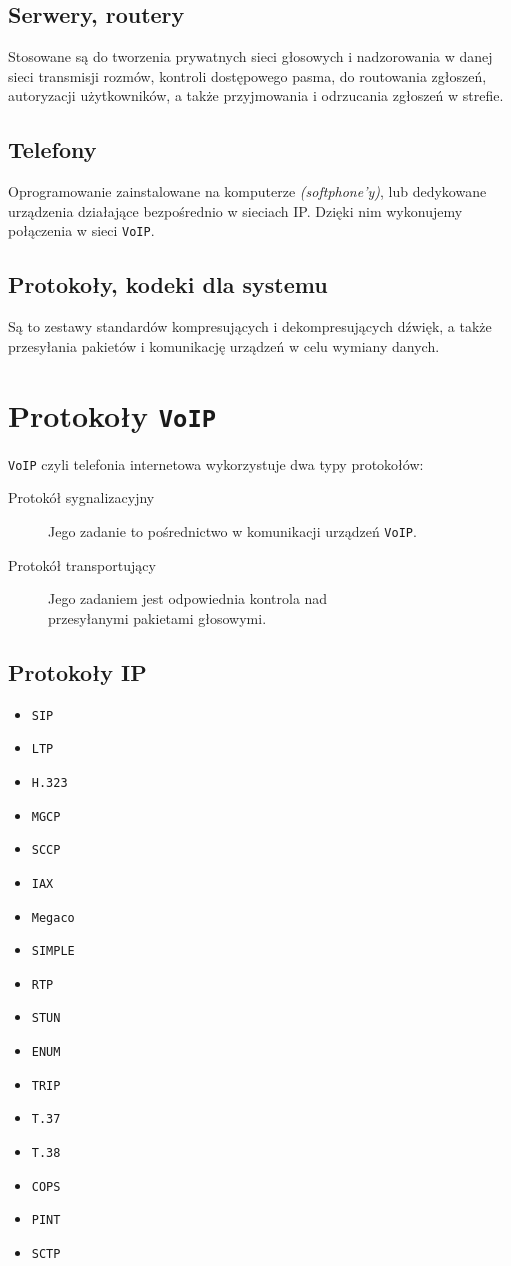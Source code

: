 \documentclass{article}
\begin{document}
\subsection{Serwery, routery}
Stosowane są do tworzenia prywatnych sieci głosowych i nadzorowania w danej sieci transmisji
rozmów, kontroli dostępowego pasma, do routowania zgłoszeń, autoryzacji
użytkowników, a także przyjmowania i odrzucania zgłoszeń w strefie.
\subsection{Telefony}
Oprogramowanie zainstalowane na komputerze \emph{(softphone'y)},
lub dedykowane urządzenia działające bezpośrednio w sieciach IP.
Dzięki nim wykonujemy połączenia w sieci {\tt VoIP}.
\subsection{Protokoły, kodeki dla systemu}
Są to zestawy standardów kompresujących i dekompresujących dźwięk,
a także przesyłania pakietów i komunikację urządzeń w celu wymiany danych.
\section{Protokoły {\tt VoIP}}
{\tt VoIP} czyli telefonia internetowa wykorzystuje dwa typy protokołów:
\begin{description}
    \item[Protokół sygnalizacyjny] Jego zadanie to pośrednictwo w komunikacji urządzeń {\tt VoIP}.
    \item[Protokół transportujący] Jego zadaniem jest odpowiednia kontrola nad \\
    przesyłanymi pakietami głosowymi.
\end{description}
\pagebreak
\subsection{Protokoły IP}
\begin{itemize}
    \item {\tt SIP}
    \item {\tt LTP}
    \item {\tt H.323}
    \item {\tt MGCP}
    \item {\tt SCCP}
    \item {\tt IAX}
    \item {\tt Megaco}
    \item {\tt SIMPLE}
    \item {\tt RTP}
    \item {\tt STUN}
    \item {\tt ENUM}
    \item {\tt TRIP}
    \item {\tt T.37}
    \item {\tt T.38}
    \item {\tt COPS}
    \item {\tt PINT}
    \item {\tt SCTP}
\end{itemize}
\pagebreak
\end{document}
